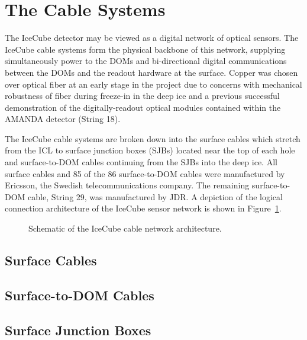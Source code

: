 
 
\section{The Cable Systems}

The IceCube detector may be viewed as a digital network of optical sensors.  The
IceCube cable systems form the physical backbone of this network, supplying
simultaneously power to the DOMs and bi-directional digital communications between
the DOMs and the readout hardware at the surface.  Copper was chosen over optical 
fiber at an early stage in the project due to concerns with mechanical robustness
of fiber during freeze-in in the deep ice and a previous successful demonstration 
of the digitally-readout optical modules contained within the AMANDA detector 
(String 18).

The IceCube cable systems are broken down into the surface cables which stretch
from the ICL to surface junction boxes (SJBs) located near the top of each hole and
surface-to-DOM cables continuing from the SJBs into the deep ice.  All surface
cables and 85 of the 86 surface-to-DOM cables were manufactured by Ericsson, the 
Swedish telecommunications company.  The remaining surface-to-DOM cable, String 29,
was manufactured by JDR.  A depiction of the logical connection architecture
of the IceCube sensor network is shown in Figure~\ref{fig:icecube-cables-logical}.

\begin{figure}
\fbox{\vspace{2in}}
\label{fig:icecube-cables-logical}
\caption{Schematic of the IceCube cable network architecture.}
\end{figure}

 
\subsection{Surface Cables}
\subsection{Surface-to-DOM Cables}
\subsection{Surface Junction Boxes}
 